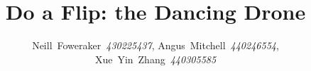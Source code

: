 \documentclass[journal]{IEEEtran}
\numberwithin{equation}{subsection}
\numberwithin{figure}{subsection}
\begin{document}
\title{Do a Flip: the Dancing Drone}
\author{Neill~Foweraker~\textit{430225437}, Angus~Mitchell~\textit{440246554}, Xue~Yin~Zhang~\textit{440305585}}
\maketitle



\begin{abstract}

\end{abstract}








\end{document}
